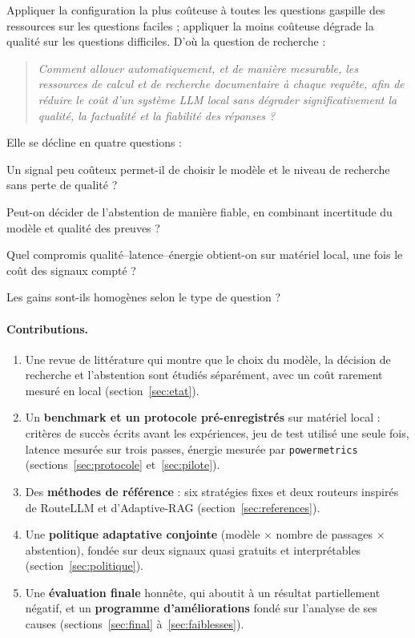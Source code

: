 \documentclass[11pt,a4paper]{article}
\begin{document}
Appliquer la configuration la plus coûteuse à toutes les questions gaspille des ressources sur les
questions faciles ; appliquer la moins coûteuse dégrade la qualité sur les questions difficiles. D'où la
question de recherche :

\begin{quote}
\emph{Comment allouer automatiquement, et de manière mesurable, les ressources de calcul et de recherche
documentaire à chaque requête, afin de réduire le coût d'un système LLM local sans dégrader
significativement la qualité, la factualité et la fiabilité des réponses ?}
\end{quote}

Elle se décline en quatre questions :
\begin{description}[style=sameline,leftmargin=1.2cm]
\item[QR1] Un signal peu coûteux permet-il de choisir le modèle et le niveau de recherche sans perte de qualité ?
\item[QR2] Peut-on décider de l'abstention de manière fiable, en combinant incertitude du modèle et qualité des preuves ?
\item[QR3] Quel compromis qualité--latence--énergie obtient-on sur matériel local, une fois le coût des signaux compté ?
\item[QR4] Les gains sont-ils homogènes selon le type de question ?
\end{description}

\paragraph{Contributions.}
\begin{enumerate}
\item Une revue de littérature qui montre que le choix du modèle, la décision de recherche et
l'abstention sont étudiés séparément, avec un coût rarement mesuré en local (section~\ref{sec:etat}).
\item Un \textbf{benchmark et un protocole pré-enregistrés} sur matériel local : critères de succès
écrits avant les expériences, jeu de test utilisé une seule fois, latence mesurée sur trois passes,
énergie mesurée par \texttt{powermetrics} (sections~\ref{sec:protocole} et~\ref{sec:pilote}).
\item Des \textbf{méthodes de référence} : six stratégies fixes et deux routeurs inspirés de RouteLLM et
d'Adaptive-RAG (section~\ref{sec:references}).
\item Une \textbf{politique adaptative conjointe} (modèle $\times$ nombre de passages $\times$ abstention),
fondée sur deux signaux quasi gratuits et interprétables (section~\ref{sec:politique}).
\item Une \textbf{évaluation finale} honnête, qui aboutit à un résultat partiellement négatif, et un
\textbf{programme d'améliorations} fondé sur l'analyse de ses causes
(sections~\ref{sec:final} à~\ref{sec:faiblesses}).
\end{enumerate}
\end{document}
